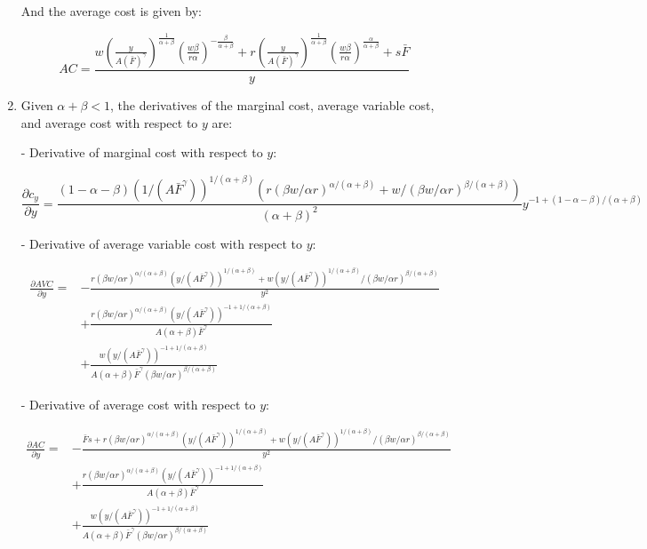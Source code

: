 \documentclass[UTF8,titlepage]{article}
\numberwithin{figure}{section}
\begin{document}
\begin{enumerate}
And the average cost is given by:

$$
AC = \frac{w\left(\frac{y}{A(\bar{F})^{\gamma}}\right)^{\frac{1}{\alpha+\beta}}\left(\frac{w\beta }{r\alpha}\right)^{-\frac{\beta}{\alpha+\beta}} + r\left(\frac{y}{A(\bar{F})^{\gamma}}\right)^{\frac{1}{\alpha+\beta}}\left(\frac{w\beta }{r\alpha}\right)^{\frac{\alpha}{\alpha+\beta}} + s\bar{F}}{y}
$$

\item Given \(\alpha+\beta<1\), the derivatives of the marginal cost, average variable cost, and average cost with respect to \(y\) are:

- Derivative of marginal cost with respect to \(y\):

$$
\frac{\partial c_{y}}{\partial y} = \frac{(1 - \alpha - \beta) (1/(A \bar{F}^{\gamma}))^{1/(\alpha + \beta)} (r (\beta w/\alpha r)^{\alpha/(\alpha + \beta)} + w/(\beta w/\alpha r)^{\beta/(\alpha + \beta)})}{(\alpha + \beta)^2} y^{-1 + (1 - \alpha - \beta)/(\alpha + \beta)}
$$

- Derivative of average variable cost with respect to \(y\):


\begin{equation}
    \begin{split}
        \frac{\partial AVC}{\partial y} = & -\frac{r (\beta w/\alpha r)^{\alpha/(\alpha + \beta)} (y/(A \bar{F}^{\gamma}))^{1/(\alpha + \beta)} + w (y/(A \bar{F}^{\gamma}))^{1/(\alpha + \beta)}/(\beta w/\alpha r)^{\beta/(\alpha + \beta)}}{y^2} \\
& + \frac{r (\beta w/\alpha r)^{\alpha/(\alpha + \beta)} (y/(A \bar{F}^{\gamma}))^{-1 + 1/(\alpha + \beta)}}{A (\alpha + \beta) \bar{F}^{\gamma}} \\
& + \frac{w (y/(A \bar{F}^{\gamma}))^{-1 + 1/(\alpha + \beta)}}{A (\alpha + \beta) \bar{F}^{\gamma} (\beta w/\alpha r)^{\beta/(\alpha + \beta)}} 
    \end{split}
\end{equation} 
    




- Derivative of average cost with respect to \(y\):

\begin{equation}
    \begin{split}
    \frac{\partial AC}{\partial y} = & -\frac{\bar{F} s + r (\beta w/\alpha r)^{\alpha/(\alpha + \beta)} (y/(A \bar{F}^{\gamma}))^{1/(\alpha + \beta)} + w (y/(A \bar{F}^{\gamma}))^{1/(\alpha + \beta)}/(\beta w/\alpha r)^{\beta/(\alpha + \beta)}}{y^2} \\
    & + \frac{r (\beta w/\alpha r)^{\alpha/(\alpha + \beta)} (y/(A \bar{F}^{\gamma}))^{-1 + 1/(\alpha + \beta)}}{A (\alpha + \beta) \bar{F}^{\gamma}} \\
    & + \frac{w (y/(A \bar{F}^{\gamma}))^{-1 + 1/(\alpha + \beta)}}{A (\alpha + \beta) \bar{F}^{\gamma} (\beta w/\alpha r)^{\beta/(\alpha + \beta)}} 
    \end{split}
\end{equation} 


\end{enumerate}
\end{document}

